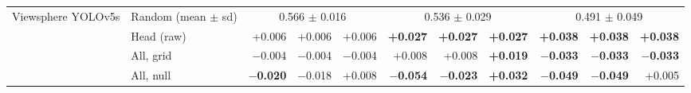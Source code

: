 \begin{tabular}{llrrrrrrrrr}
\midrule
Viewsphere YOLOv5s & Random (mean $\pm$ sd) & \multicolumn{3}{c}{0.566 $\pm$ 0.016} & \multicolumn{3}{c}{0.536 $\pm$ 0.029} & \multicolumn{3}{c}{0.491 $\pm$ 0.049} \\
 & Head (raw) & +0.006 & +0.006 & +0.006 & \textbf{+0.027} & \textbf{+0.027} & \textbf{+0.027} & \textbf{+0.038} & \textbf{+0.038} & \textbf{+0.038} \\
 & All, grid & $-$0.004 & $-$0.004 & $-$0.004 & +0.008 & +0.008 & \textbf{+0.019} & \textbf{$-$0.033} & \textbf{$-$0.033} & \textbf{$-$0.033} \\
 & All, null & \textbf{$-$0.020} & $-$0.018 & +0.008 & \textbf{$-$0.054} & \textbf{$-$0.023} & \textbf{+0.032} & \textbf{$-$0.049} & \textbf{$-$0.049} & +0.005 \\
\bottomrule
\end{tabular}
